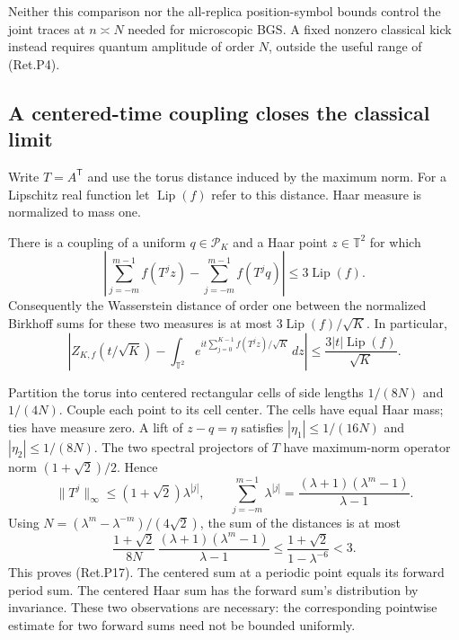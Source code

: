 Neither this comparison nor the all-replica position-symbol bounds
control the joint traces at \(n\asymp N\) needed for microscopic BGS.
A fixed nonzero classical kick instead requires quantum amplitude
of order \(N\), outside the useful range of (Ret.P4).

\hypertarget{a-centered-time-coupling-closes-the-classical-limit}{%
\subsection{A centered-time coupling closes the classical limit}\label{a-centered-time-coupling-closes-the-classical-limit}}

Write \(T=A^{\mathsf T}\) and use the torus distance induced by the maximum
norm. For a Lipschitz real function let \(\operatorname{Lip}(f)\) refer to
this distance. Haar measure is normalized to mass one.

\begin{lemma}[coupling]\label{pass1:return_periodic-3} There is a coupling of a uniform \(q\in\mathcal P_K\)
and a Haar point \(z\in\mathbb T^2\) for which
\[
 \left|\sum_{j=-m}^{m-1} f(T^jz)-\sum_{j=-m}^{m-1}f(T^jq)\right|
                    \le3\operatorname{Lip}(f).             \tag{Ret.P17}
\]
Consequently the Wasserstein distance of order one between the normalized
Birkhoff sums for these two measures is at most
\(3\operatorname{Lip}(f)/\sqrt K\). In particular,
\[
 \left|Z_{K,f}(t/\sqrt K)-
   \int_{\mathbb T^2}e^{it\sum_{j=0}^{K-1}f(T^jz)/\sqrt K}\,dz\right|
       \le \frac{3|t|\operatorname{Lip}(f)}{\sqrt K}.
\]
\end{lemma}

Partition the torus into centered rectangular cells of side lengths
\(1/(8N)\) and \(1/(4N)\). Couple each point to its cell center. The cells
have equal Haar mass; ties have measure zero. A lift of \(z-q=\eta\)
satisfies \(|\eta_1|\le1/(16N)\) and \(|\eta_2|\le1/(8N)\).
The two spectral projectors of \(T\) have maximum-norm operator norm
\((1+\sqrt2)/2\). Hence
\[
 \|T^j\|_\infty\le(1+\sqrt2)\lambda^{|j|},\qquad
 \sum_{j=-m}^{m-1}\lambda^{|j|}
             =\frac{(\lambda+1)(\lambda^m-1)}{\lambda-1}.
\]
Using \(N=(\lambda^m-\lambda^{-m})/(4\sqrt2)\), the sum of the
distances is at most
\[
 \frac{1+\sqrt2}{8N}\,
       \frac{(\lambda+1)(\lambda^m-1)}{\lambda-1}
 \le \frac{1+\sqrt2}{1-\lambda^{-6}}<3.
\]
This proves (Ret.P17). The centered sum at a periodic point equals its forward
period sum. The centered Haar sum has the forward sum's distribution by
invariance. These two observations are necessary: the corresponding
pointwise estimate for two forward sums need not be bounded uniformly.

